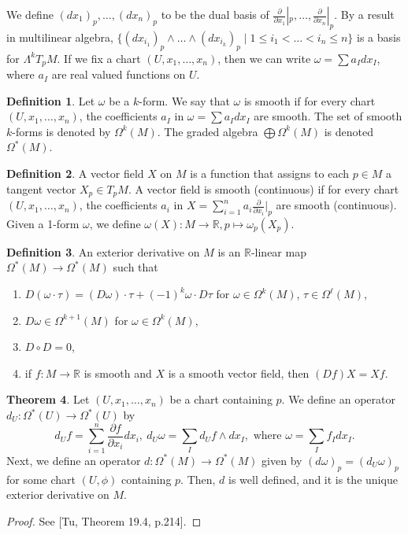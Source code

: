\documentclass[]{article}
\theoremstyle{definition}
\newtheorem{theorem}{Theorem}[section] %
\theoremstyle{definition}
\newtheorem{definition}[theorem]{Definition} %
\begin{document}
We define $(dx_1)_p, \dots, (dx_n)_p$ to be the dual basis of $\frac{\partial}{\partial x_1}|_p, \dots, \frac{\partial}{\partial x_n}|_p$. By a result in multilinear algebra, $\{(dx_{i_1})_p\wedge\dots\wedge(dx_{i_k})_p\mid 1\leq i_1<\dots<i_n\leq n\}$ is a basis for $\Lambda^kT_pM$. If we fix a chart $(U, x_1, \dots, x_n)$, then we can write $\omega=\sum a_Idx_I$, where $a_I$ are real valued functions on $U$.

\begin{definition}
Let $\omega$ be a $k$-form. We say that $\omega$ is smooth if for every chart $(U, x_1, \dots, x_n)$, the coefficients $a_I$ in $\omega=\sum a_Idx_I$ are smooth. The set of smooth $k$-forms is denoted by $\Omega^k(M)$. The graded algebra $\bigoplus \Omega^k(M)$ is denoted $\Omega^*(M)$.
\end{definition}

\begin{definition}
    A vector field $X$ on $M$ is a function that assigns to each $p\in M$ a tangent vector $X_p\in T_pM$. A vector field is smooth (continuous) if for every chart $(U, x_1, \dots, x_n)$, the coefficients $a_i$ in $X=\sum_{i=1}^na_i\frac{\partial}{\partial x_i}|_p$ are smooth (continuous). Given a 1-form $\omega$, we define $\omega(X):M \rightarrow \mathbb{R}, p\mapsto \omega_p(X_p)$.
\end{definition}

\begin{definition}
    An exterior derivative on $M$ is an $\mathbb{R}$-linear map $\Omega^*(M) \rightarrow \Omega^*(M)$ such that \begin{enumerate}
        \item $D(\omega\cdot \tau)=(D\omega)\cdot \tau+(-1)^k\omega\cdot D\tau$ for $\omega\in \Omega^k(M)$, $\tau\in \Omega^\ell(M)$,
        \item $D\omega\in\Omega^{k+1}(M)$ for $\omega\in\Omega^k(M)$,
        \item $D\circ D=0$,
        \item if $f:M \rightarrow \mathbb{R}$ is smooth and $X$ is a smooth vector field, then $(Df)X=Xf$.
    \end{enumerate}
\end{definition}

\begin{theorem}
    Let $(U, x_1, \dots, x_n)$ be a chart containing $p$. We define an operator $d_U:\Omega^*(U) \rightarrow \Omega^*(U)$ by \[d_Uf=\sum_{i=1}^n \frac{\partial f}{\partial x_i}dx_i,\ d_U\omega=\sum_I d_Uf\wedge dx_I,\text{ where }\omega=\sum_I f_I dx_I.\] Next, we define an operator $d:\Omega^*(M)\rightarrow \Omega^*(M)$ given by $(d\omega)_p=(d_U\omega)_p$ for some chart $(U, \phi)$ containing $p$. Then, $d$ is well defined, and it is the unique exterior derivative on $M$.
\end{theorem}
\begin{proof}
    See [Tu, Theorem 19.4, p.214].
\end{proof}
\end{document}
